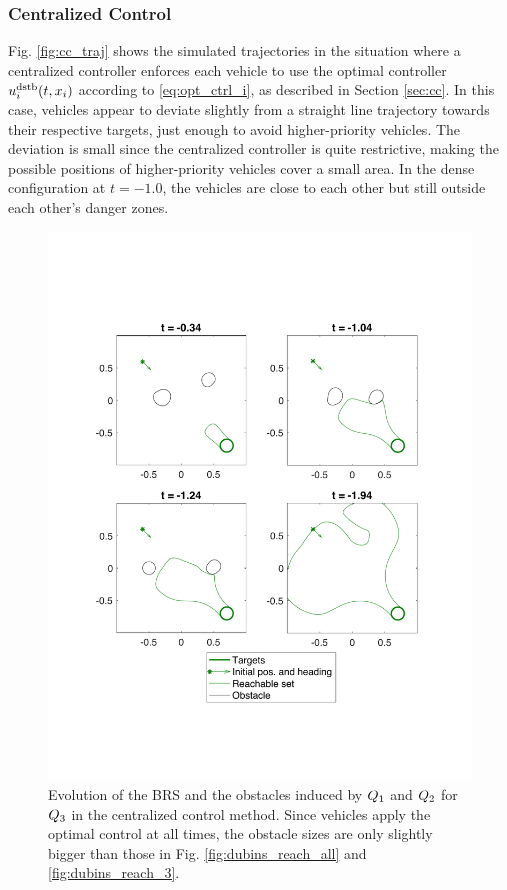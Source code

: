 \subsubsection{Centralized Control}
Fig. \ref{fig:cc_traj} shows the simulated trajectories in the situation where a centralized controller enforces each vehicle to use the optimal controller $u^\text{dstb}_i(t, x_i)$ according to \eqref{eq:opt_ctrl_i}, as described in Section \ref{sec:cc}. In this case, vehicles appear to deviate slightly from a straight line trajectory towards their respective targets, just enough to avoid higher-priority vehicles. The deviation is small since the centralized controller is quite restrictive, making the possible positions of higher-priority vehicles cover a small area. In the dense configuration at $t=-1.0$, the vehicles are close to each other but still outside each other's danger zones.

\begin{figure}[H]
  \centering
  \includegraphics[width=\columnwidth]{"fig/cc_rs3"}
  \caption{Evolution of the BRS and the obstacles induced by $Q_1$ and $Q_2$ for $Q_3$ in the centralized control method. Since vehicles apply the optimal control at all times, the obstacle sizes are only slightly bigger than those in Fig. \ref{fig:dubins_reach_all} and \ref{fig:dubins_reach_3}.}
  \label{fig:cc_rs3}
\end{figure}

